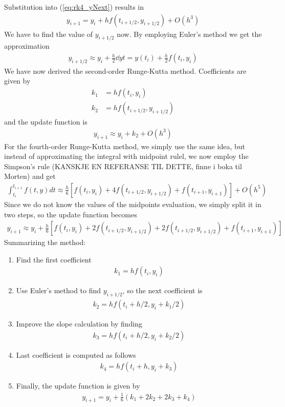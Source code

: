 \documentclass[a4paper, 10pt]{article}
\begin{document}
Substitution into (\ref{eq:rk4_yNext}) results in
 \begin{align*}
   y_{i+1} = y_{i} + h f(t_{i+1/2},y_{i+1/2}) + O(h^{3})
 \end{align*}
  We have to find the value of $y_{i+1/2}$ now. By employing Euler's method we
  get the approximation
  \begin{align*}
	y_{i+1/2} \approx  y_{i} + \frac{h}{2}\dd{y}{t} = y(t_{i}) + \frac{h}{2} f(t_{i}, y_{i})
  \end{align*}
  We have now derived the second-order Runge-Kutta method. Coefficients are
  given by
  \begin{align*}
	k_{1} &= h f(t_{i}, y_{i}) \\
    k_{2} &= h f(t_{i+1/2}, y_{i+1/2})
  \end{align*}
  and the update function is
  \begin{align*}
	y_{i+1} \approx y_{i} + k_{2} + O(h^{3})
  \end{align*}
  For the fourth-order Runge-Kutta method, we simply use the same idea, but
  instead of approximating the integral with midpoint rulel, we now employ the
  Simpson's rule (KANSKJE EN REFERANSE TIL DETTE, finne i boka til Morten) and
  get
  \begin{align*}
	\int_{t_{i}}^{t_{i+1}} f(t,y)dt  \approx  \frac{h}{6}\left[f(t_{i},y_{i}) +
    4f(t_{i+1/2}, y_{i+1/2}) + f(t_{i+1}, y_{i+1})\right] + O(h^{5})
  \end{align*}
  Since we do not know the values of the midpoints evaluation, we simply split
  it in two steps, so the update function becomes
  \begin{align*}
	y_{i+1} \approx y_{i} + \frac{h}{6}\left[f(t_{i},y_{i}) + 2f(t_{i+1/2},
    y_{i+1/2}) + 2f(t_{i+1/2}, y_{i+1/2}) + f(t_{i+1},y_{i+1})\right]
  \end{align*}
  Summarizing the method:
  \begin{enumerate}
  \item Find the first coefficient
    \begin{align*}
      k_{1} = hf(t_{i},y_{i})
    \end{align*}
  \item Use Euler's method to find $y_{i+1/2}$, so the next coefficient is
    \begin{align*}
      k_{2} = hf(t_{i}+h/2, y_{i}+k_{1}/2)
    \end{align*}
  \item Improve the slope calculation by finding
    \begin{align*}
      k_{3} = hf(t_{i} + h/2, y_{i}+k_{2}/2)
    \end{align*}
  \item Last coefficient is computed as follows
    \begin{align*}
      k_{4} = hf(t_{i} + h, y_{i} + k_{3})
    \end{align*}
  \item Finally, the update function is given by
    \begin{align*}
      y_{i+1} = y_{i} + \frac{1}{6}\left(k_{1} + 2k_{2} + 2k_{3} + k_{4}\right)
    \end{align*}
  \end{enumerate}
\end{document}
